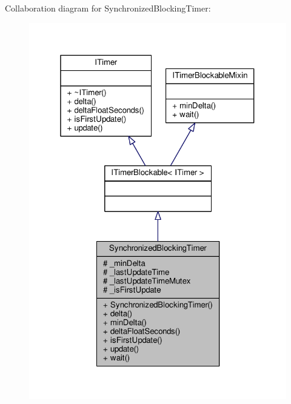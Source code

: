 Collaboration diagram for Synchronized\-Blocking\-Timer\-:
\nopagebreak
\begin{figure}[H]
\begin{center}
\leavevmode
\includegraphics[width=321pt]{class_synchronized_blocking_timer__coll__graph}
\end{center}
\end{figure}
